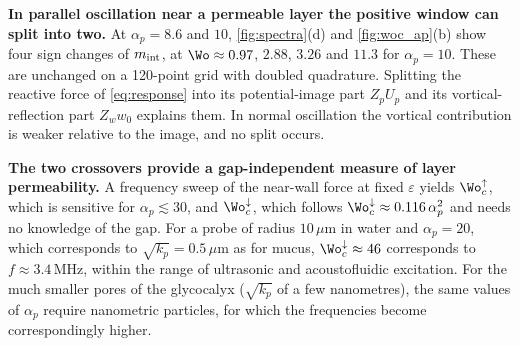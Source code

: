 \textbf{In parallel oscillation near a permeable layer the positive window can split into two.} At $\alpha_p=8.6$ and
$10$, \cref{fig:spectra}(d) and \cref{fig:woc_ap}(b) show four sign changes of $m_{\rm int}$, at
$\Wo\approx0.97$, $2.88$, $3.26$ and $11.3$ for $\alpha_p=10$. These are unchanged on a 120-point grid with doubled
quadrature. Splitting the reactive force of \cref{eq:response} into its potential-image part $Z_pU_p$ and its
vortical-reflection part $Z_ww_0$ explains them.  In normal
oscillation the vortical contribution is weaker relative to the image, and no split occurs.

\textbf{The two crossovers provide a gap-independent measure of layer permeability.} A frequency sweep of the near-wall
force at fixed $\varepsilon$ yields $\Wo_c^{\uparrow}$, which is sensitive for $\alpha_p\lesssim30$, and
$\Wo_c^{\downarrow}$, which follows $\Wo_c^{\downarrow}\approx0.116\,\alpha_p^2$ and needs no knowledge of the gap. For a
probe of radius $10\,\mu$m in water and $\alpha_p=20$, which corresponds to $\sqrt{k_p}=0.5\,\mu$m as for mucus,
$\Wo_c^{\downarrow}\approx46$ corresponds to $f\approx3.4$\,MHz, within the range of ultrasonic and acoustofluidic
excitation. For the much smaller pores of the glycocalyx ($\sqrt{k_p}$ of a few nanometres), the same values of
$\alpha_p$ require nanometric particles, for which the frequencies become correspondingly higher. 
